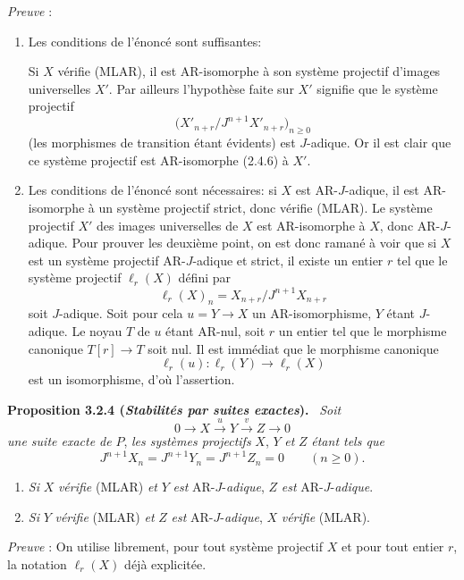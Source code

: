 \documentclass[11pt]{article}
\newenvironment{statement}[1]{\par\medskip\noindent\textbf{#1.}\ }{\par\medskip}
\begin{document}
\emph{Preuve} :
\begin{enumerate}[label=(\alph*)]
\item Les conditions de l'énoncé sont suffisantes:

Si $X$ vérifie (MLAR), il est AR-isomorphe à son système projectif d'images universelles $X'$. Par ailleurs l'hypothèse faite sur $X'$ signifie que le système projectif
\[
\bigl(X'_{n+r}/J^{n+1}X'_{n+r}\bigr)_{n\ge0}
\]
(les morphismes de transition étant évidents) est $J$-adique. Or il est clair que ce système projectif est AR-isomorphe (2.4.6) à $X'$.
\item Les conditions de l'énoncé sont nécessaires: si $X$ est AR-$J$-adique, il est AR-isomorphe à un système projectif strict, donc vérifie (MLAR). 
Le
système projectif $X'$ des images universelles de $X$ est AR-isomorphe à $X$, donc AR-$J$-adique. Pour prouver les deuxième point, on est donc ramané à voir que si $X$ est un système projectif AR-$J$-adique et strict, il existe un entier $r$ tel que le système projectif $\ell_r(X)$ défini par
\[
\ell_r(X)_n=X_{n+r}/J^{n+1}X_{n+r}
\]
soit $J$-adique. Soit pour cela $u=Y\to X$ un AR-isomorphisme, $Y$ étant $J$-adique. Le noyau $T$ de $u$ étant AR-nul, soit $r$ un entier tel que le morphisme canonique $T[r]\to T$ soit nul. Il est immédiat que le morphisme canonique
\[
\ell_r(u):\ell_r(Y)\longrightarrow\ell_r(X)
\]
est un isomorphisme, d'où l'assertion.
\end{enumerate}

\begin{statement}{Proposition 3.2.4 (\emph{Stabilités par suites exactes})}
\emph{Soit}
\[
0\longrightarrow X\stackrel{u}{\longrightarrow}Y\stackrel{v}{\longrightarrow}Z\longrightarrow0
\]
\emph{une suite exacte de} $P$, \emph{les systèmes projectifs} $X$, $Y$ \emph{et} $Z$ \emph{étant tels que}
\[
J^{n+1}X_n=J^{n+1}Y_n=J^{n+1}Z_n=0\qquad(n\ge0).
\]
\begin{enumerate}[label=(\roman*)]
\item \emph{Si} $X$ \emph{vérifie} (MLAR) \emph{et} $Y$ \emph{est} AR-$J$-\emph{adique}, $Z$ \emph{est} AR-$J$-\emph{adique}.
\item \emph{Si} $Y$ \emph{vérifie} (MLAR) \emph{et} $Z$ \emph{est} AR-$J$-\emph{adique}, $X$ \emph{vérifie} (MLAR).
\end{enumerate}
\end{statement}

\emph{Preuve} : On utilise librement, pour tout système projectif $X$ et pour tout entier $r$, la notation $\ell_r(X)$ déjà explicitée.
\end{document}
